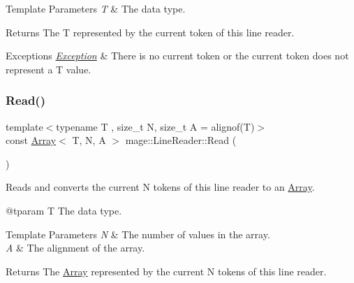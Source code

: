 \begin{DoxyTemplParams}{Template Parameters}
{\em T} & The data type. \\
\hline
\end{DoxyTemplParams}
\begin{DoxyReturn}{Returns}
The {\ttfamily T} represented by the current token of this line reader. 
\end{DoxyReturn}

\begin{DoxyExceptions}{Exceptions}
{\em \mbox{\hyperlink{classmage_1_1_exception}{Exception}}} & There is no current token or the current token does not represent a {\ttfamily T} value. \\
\hline
\end{DoxyExceptions}
\mbox{\label{classmage_1_1_line_reader_a208eb25a7715761178317eec72c93c75}} 
\subsubsection{\texorpdfstring{Read()}{Read()}\hspace{0.1cm}{\footnotesize\ttfamily [2/2]}}
{\footnotesize\ttfamily template$<$typename T , size\+\_\+t N, size\+\_\+t A = alignof(\+T)$>$ \\
const \mbox{\hyperlink{structmage_1_1_array}{Array}}$<$ T, N, A $>$ mage\+::\+Line\+Reader\+::\+Read (\begin{DoxyParamCaption}{ }\end{DoxyParamCaption})\hspace{0.3cm}{\ttfamily [protected]}}

Reads and converts the current {\ttfamily N} tokens of this line reader to an {\ttfamily \mbox{\hyperlink{structmage_1_1_array}{Array}}}.

@tparam T The data type. 
\begin{DoxyTemplParams}{Template Parameters}
{\em N} & The number of values in the array. \\
\hline
{\em A} & The alignment of the array. \\
\hline
\end{DoxyTemplParams}
\begin{DoxyReturn}{Returns}
The {\ttfamily \mbox{\hyperlink{structmage_1_1_array}{Array}}} represented by the current {\ttfamily N} tokens of this line reader. 
\end{DoxyReturn}

